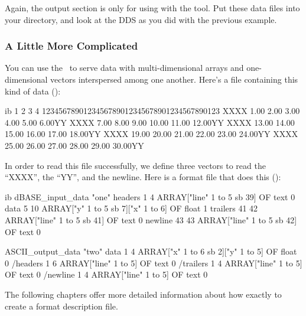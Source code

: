 Again, the output section is only for using with the 
tool.  Put these data files into your  directory, and look
at the DDS as you did with the previous example.


\subsubsection{A Little More Complicated}

You can use the \ffs\ to serve data with multi-dimensional arrays and
one-dimensional vectors interspersed among one another.  Here's a file
containing this kind of data 
(): 

\begin{vcode}{ib}
         1         2         3         4
1234567890123456789012345678901234567890123
XXXX  1.00  2.00  3.00  4.00  5.00  6.00YY
XXXX  7.00  8.00  9.00 10.00 11.00 12.00YY
XXXX 13.00 14.00 15.00 16.00 17.00 18.00YY
XXXX 19.00 20.00 21.00 22.00 23.00 24.00YY
XXXX 25.00 26.00 27.00 28.00 29.00 30.00YY
\end{vcode}

In order to read this file successfully, we define three vectors to
read the ``XXXX'', the ``YY'', and the newline.  Here is a format file
that does this 
(): 

\begin{vcode}{ib}
dBASE_input_data "one"
headers 1 4 ARRAY["line" 1 to 5 sb 39] OF text 0
data 5 10 ARRAY["y" 1 to 5 sb 7]["x" 1 to 6] OF float 1
trailers 41 42 ARRAY["line" 1 to 5 sb 41] OF text 0
newline 43 43 ARRAY["line" 1 to 5 sb 42] OF text 0

ASCII_output_data "two"
data 1 4 ARRAY["x" 1 to 6 sb 2]["y" 1 to 5] OF float 0
/headers 1 6 ARRAY["line" 1 to 5] OF text 0
/trailers 1 4 ARRAY["line" 1 to 5] OF text 0
/newline 1 4 ARRAY["line" 1 to 5] OF text 0
\end{vcode}

The following chapters offer more detailed information about how
exactly to create a format description file.






